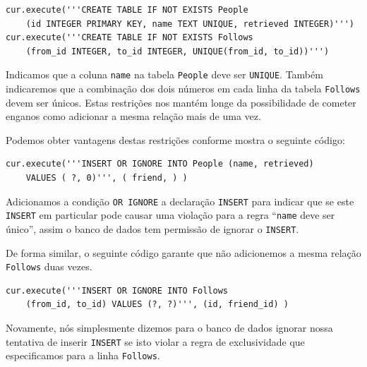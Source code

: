 \beforeverb
\begin{verbatim}
cur.execute('''CREATE TABLE IF NOT EXISTS People 
    (id INTEGER PRIMARY KEY, name TEXT UNIQUE, retrieved INTEGER)''')
cur.execute('''CREATE TABLE IF NOT EXISTS Follows 
    (from_id INTEGER, to_id INTEGER, UNIQUE(from_id, to_id))''')
\end{verbatim}
\afterverb
%
Indicamos que a coluna {\tt name} na tabela {\tt People} deve ser {\tt UNIQUE}.
Também indicaremos que a combinação dos dois números em cada linha da tabela
{\tt Follows} devem ser únicos. Estas restrições nos mantém longe da
possibilidade de cometer enganos como adicionar a mesma relação mais de uma vez.

Podemos obter vantagens destas restrições conforme mostra o seguinte código:

\beforeverb
\begin{verbatim}
cur.execute('''INSERT OR IGNORE INTO People (name, retrieved) 
    VALUES ( ?, 0)''', ( friend, ) )
\end{verbatim}
\afterverb
%
%
Adicionamos a condição {\tt OR IGNORE} a declaração {\tt INSERT} para indicar
que se este {\tt INSERT} em particular pode causar uma violação para a regra
``{\tt name} deve ser único'', assim o banco de dados tem permissão de ignorar
o {\tt INSERT}.

De forma similar, o seguinte código garante que não adicionemos a mesma relação
{\tt Follows} duas vezes.

\beforeverb
\begin{verbatim}
cur.execute('''INSERT OR IGNORE INTO Follows 
    (from_id, to_id) VALUES (?, ?)''', (id, friend_id) )
\end{verbatim}
\afterverb
%
Novamente, nós simplesmente dizemos para o banco de dados ignorar nossa
tentativa de inserir {\tt INSERT} se isto violar a regra de exclusividade que
especificamos para a linha {\tt Follows}.

